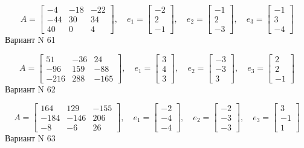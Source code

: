 \documentclass[11pt]{report}
\begin{document}
$$A = \left[\begin{matrix}-4 & -18 & -22\\-44 & 30 & 34\\40 & 0 & 4\end{matrix}\right],\quad e_1 = \left[\begin{matrix}-2\\2\\-1\end{matrix}\right],\quad e_2 = \left[\begin{matrix}-1\\2\\-3\end{matrix}\right],\quad e_3 = \left[\begin{matrix}-1\\3\\-4\end{matrix}\right]$$Вариант N 61

$$A = \left[\begin{matrix}51 & -36 & 24\\-96 & 159 & -88\\-216 & 288 & -165\end{matrix}\right],\quad e_1 = \left[\begin{matrix}3\\4\\3\end{matrix}\right],\quad e_2 = \left[\begin{matrix}-3\\-3\\3\end{matrix}\right],\quad e_3 = \left[\begin{matrix}2\\2\\-1\end{matrix}\right]$$Вариант N 62

$$A = \left[\begin{matrix}164 & 129 & -155\\-184 & -146 & 206\\-8 & -6 & 26\end{matrix}\right],\quad e_1 = \left[\begin{matrix}-2\\-4\\-4\end{matrix}\right],\quad e_2 = \left[\begin{matrix}-2\\-3\\-3\end{matrix}\right],\quad e_3 = \left[\begin{matrix}3\\-1\\1\end{matrix}\right]$$Вариант N 63
\end{document}
